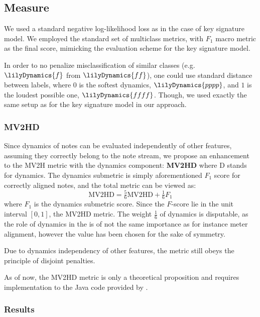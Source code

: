 \subsection{Measure}

We used a standard negative log-likelihood loss as in the case of key signature model. We employed the standard set of multiclass metrics, with $F_1$ macro metric as the final score, mimicking the evaluation scheme for the key signature model.

In order to no penalize misclassification of similar classes (e.g. $\lilyDynamics{f}$ from $\lilyDynamics{ff}$), one could use standard distance between labels, where $0$ is the softest dynamics, $\lilyDynamics{pppp}$, and $1$ is the loudest possible one, $\lilyDynamics{ffff}$. Though, we used exactly the same setup as for the key signature model in our approach.

\subsubsection{MV2HD}

Since dynamics of notes can be evaluated independently of other features, assuming they correctly belong to the note stream, we propose an enhancement to the MV2H metric with the dynamics component: \textbf{MV2HD} where D stands for dynamics. The dynamics submetric is simply aforementioned $F_1$ score for correctly aligned notes, and the total metric can be viewed as: \[\textrm{MV2HD} = \tfrac{5}{6}\textrm{MV2HD} + \tfrac{1}{6}F_1\] where $F_1$ is the dynamics submetric score. Since the $F$-score lie in the unit interval $[0, 1]$, the MV2HD metric. The weight $\tfrac{1}{6}$ of dynamics is disputable, as the role of dynamics in the is of not the same importance as for instance meter alignment, however the value has been chosen for the sake of symmetry.

Due to dynamics independency of other features, the metric still obeys the principle of disjoint penalties.

As of now, the MV2HD metric is only a theoretical proposition and requires implementation to the Java code provided by \cite{McLeod2019}.

\subsubsection{Results}

